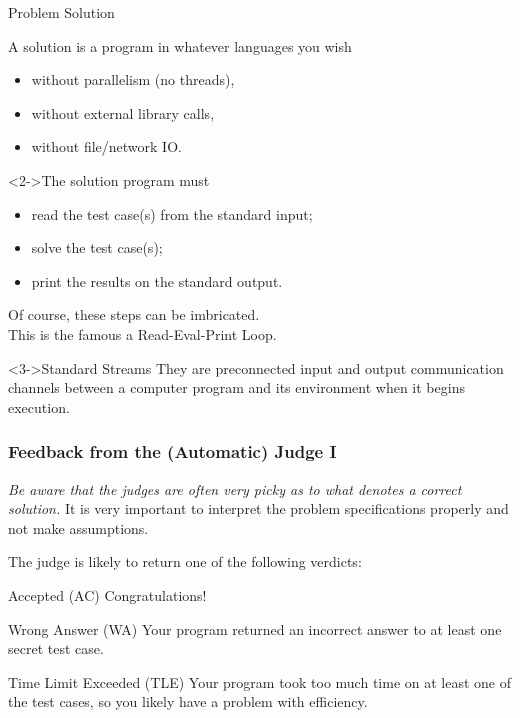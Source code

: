 \documentclass{beamer}
\begin{document}
\begin{frame}{Problem Solution}
  \begin{block}{A solution is a program in whatever languages you wish}
  \begin{itemize}
  \item without parallelism (no threads),
  \item without external library calls,
  \item without file/network IO.
  \end{itemize}
  \end{block}

  \begin{block}<2->{The solution program must}
    \begin{itemize}
    \item read the test case(s) from the standard input;
    \item solve the test case(s);
    \item print the results on the standard output.
    \end{itemize}
    Of course, these steps can be imbricated.
    \\
    This is the famous a \alert{Read-Eval-Print Loop}.
\end{block}

  \begin{block}<3->{Standard Streams}
    They are preconnected input and output communication channels between a computer program and its environment when it begins execution.
  \end{block}
\end{frame}



\begin{frame}
  \frametitle{Feedback from the (Automatic) Judge I}
  \emph{Be aware that the judges are often very picky as to what denotes a correct solution.}
  It is very important to interpret the problem specifications properly and not make assumptions.

  The judge is likely to return one of the following verdicts:

  \begin{block}{Accepted (AC)}
    Congratulations!
  \end{block}

  \begin{block}{Wrong Answer (WA)}
    Your program returned an incorrect answer to at least one secret test case.
  \end{block}

  \begin{block}{Time Limit Exceeded (TLE)}
    Your program took too much time on at least one of the test cases, so you likely have a problem with efficiency.
  \end{block}

\end{frame}
\end{document}
